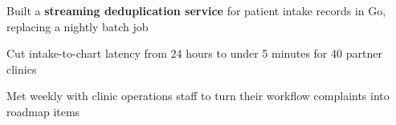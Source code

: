 \begin{bullets}
  \item Built a \textbf{streaming deduplication service} for patient intake records in Go, replacing a nightly batch job
  \item Cut intake-to-chart latency from 24 hours to under 5 minutes for 40 partner clinics
  \item Met weekly with clinic operations staff to turn their workflow complaints into roadmap items
\end{bullets}
